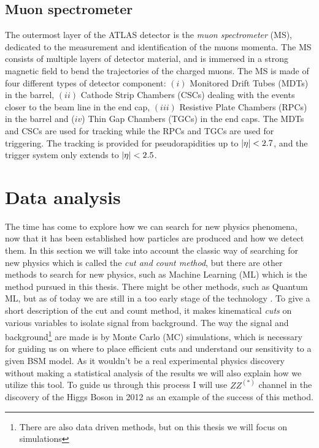 \documentclass[12pt, a4paper]{book}
\begin{document}
\subsection{Muon spectrometer}\label{sec:MS}
The outermost layer of the ATLAS detector is the \textit{muon spectrometer} (MS), dedicated to the measurement and identification of the muons momenta. The MS consists of multiple layers of detector material, 
and is immersed in a strong magnetic field to bend the trajectories of the charged muons. The MS is made of four different types of detector component: $(i)$ Monitored Drift Tubes (MDTs) in the barrel, 
$(ii)$ Cathode Strip Chambers (CSCs) dealing with the events closer to the beam line in the end cap, $(iii)$ Resistive Plate Chambers (RPCs) in the barrel and ($iv$) Thin Gap Chambers (TGCs) in the end caps. 
The MDTs and CSCs are used for tracking while the RPCs and TGCs are used for triggering. The tracking is provided for pseudorapidities up to $\abs{\eta}<2.7$, and the trigger system only extends to $\abs{\eta}<2.5$.

\section{Data analysis}\label{sec:data_anal}
The time has come to explore how we can search for new physics phenomena, now that it has been established how particles are produced and how we detect them. In this section we will take into account the classic way of searching for new physics which is called 
the \textit{cut and count method}, but there are other methods to search for new physics, such as Machine Learning (ML) which is the method pursued in this thesis. There might be other methods, such as 
Quantum ML, but as of today we are still in a too early stage of the technology \cite{QML}. To give a short description of the cut and count method, it makes kinematical \textit{cuts} on various variables to isolate signal from background. The way 
the signal and background\footnote{There are also data driven methods, but on this thesis we will focus on simulations} are made is by Monte Carlo (MC) simulations, which is necessary for guiding us on where to place efficient cuts and understand our sensitivity to a given BSM model. As it wouldn't be a real experimental physics discovery without making a statistical 
analysis of the results we will also explain how we utilize this tool. To guide us through this process I will use $ZZ^{(*)}$ channel in the discovery of the Higgs Boson in 2012 \cite{Higgs_discovery_2012} as an example of the success of this method.
\end{document}

